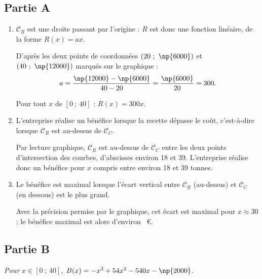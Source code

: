 \subsection*{Partie A}

\begin{enumerate}
	\item $\mathcal{C}_R$ est une droite passant par l'origine : $R$ est donc une fonction linéaire, de la forme $R(x) = ax$.

	D'après les deux points de coordonnées $(20~;~\np{6000})$ et $(40~;~\np{12000})$ marqués sur le graphique :
	\[a = \dfrac{\np{12000} - \np{6000}}{40 - 20} = \dfrac{\np{6000}}{20} = 300.\]
	
Pour tout $x$ de $[0~;~40]$ : $R(x) = 300x$.

	\item L'entreprise réalise un bénéfice lorsque la recette dépasse le coût, c'est-à-dire lorsque
	$\mathcal{C}_R$ est au-dessus de $\mathcal{C}_C$.

	Par lecture graphique, $\mathcal{C}_R$ est au-dessus de $\mathcal{C}_C$ entre les deux
	points d'intersection des courbes, d'abscisses environ 18 et 39.
	L'entreprise réalise donc un bénéfice pour $x$ compris entre environ
	18 et 39 tonnes.

	\item Le bénéfice est maximal lorsque l'écart vertical
	entre $\mathcal{C}_R$ (au-dessus) et $\mathcal{C}_C$ (en dessous) est le plus grand.

	Avec la précision permise par le graphique, cet écart est maximal pour
	$x \approx 30$ ; le bénéfice maximal est alors d'environ ~\euro.
\end{enumerate}

\subsection*{Partie B}

\emph{Pour $x \in [0~;~40]$, $B(x) = -x^3+54x^2-540x-\np{2000}$.}


